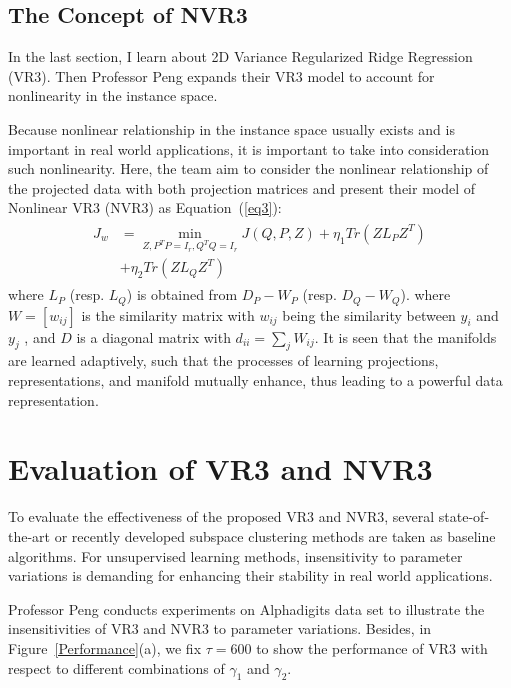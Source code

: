 \documentclass[twocolumn]{article}
\begin{document}
	\subsection{The Concept of NVR3}
	In the last section, I learn about 2D Variance Regularized Ridge Regression (VR3). Then Professor Peng expands their VR3 model to account for nonlinearity in the instance space. 
	
	Because nonlinear relationship in the instance space usually exists and is important in real world applications, it is important to take into consideration such nonlinearity. Here, the team aim to consider the nonlinear relationship of the projected data with both projection matrices and present their model of Nonlinear VR3 (NVR3) as Equation~(\ref{eq3}):
	\begin{equation}
	\begin{aligned}
	\begin{split}
	J_w&= \min_{Z,P^TP=I_r,Q^TQ=I_r}J(Q,P,Z)+ \eta_1 Tr\left(ZL_PZ^T\right) \\
	&+\eta_2 Tr\left(ZL_QZ^T\right)    \label{eq3}
	\end{split} 
	\end{aligned}
	\end{equation}
	where $L_P$ (resp. $L_Q$) is obtained from $D_P-W_P$ (resp. $D_Q-W_Q$). where $W = \left[w_{ij}\right] $ is the similarity matrix with $w_{ij}$ being the similarity between $y_i$ and $y_j$ , and $D$ is a diagonal matrix with $d_{ii}=\sum_{j}W_{ij}$. It is seen that the manifolds are learned adaptively, such that the processes of learning projections, representations, and manifold mutually enhance, thus leading to a powerful data representation.

    \section{Evaluation of VR3 and NVR3}
    To evaluate the effectiveness of the proposed VR3 and NVR3, several state-of-the-art or recently developed subspace clustering methods are taken as baseline algorithms. For unsupervised learning methods, insensitivity to parameter variations is demanding for enhancing their stability in real world applications. 
    
    Professor Peng conducts experiments on Alphadigits data set to illustrate the insensitivities of VR3 and NVR3 to parameter variations. Besides, in Figure~\ref{Performance}(a), we fix $\tau=600$ to show the performance of VR3 with respect to different combinations of $\gamma_1$ and $\gamma_2$. 
    
\end{document}
